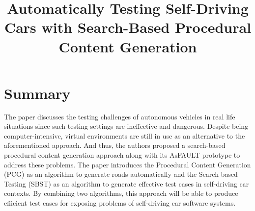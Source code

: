 \documentclass[10pt,a4paper]{report}
\title{Automatically Testing Self-Driving Cars with Search-Based Procedural Content Generation}
\begin{document}
\begin{center}
\textbf{\thetitle}
\end{center}


\section{Summary}
The paper discusses the testing challenges of autonomous vehicles in real life situations since  such testing settings are ineffective and dangerous. 
%
Despite being computer-intensive, virtual environments are still in use as an alternative to the aforementioned approach. And thus, the authors proposed a search-based procedural content generation approach along with its AsFAULT prototype to address these problems. 
%
The paper introduces the Procedural Content Generation (PCG) as an algorithm to generate roads automatically and the Search-based Testing (SBST) as an algorithm to generate effective test cases in self-driving car contexts.
% 
By combining two algorithms, this approach will be able to produce efiicient test cases for exposing problems of self-driving car software systems.
\end{document}
